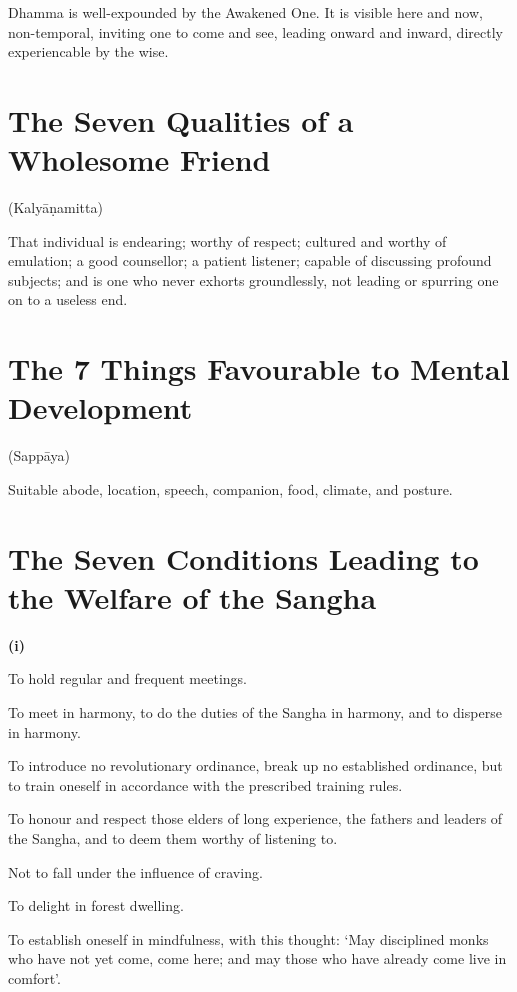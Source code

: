 Dhamma is well-expounded by the Awakened One. It is visible here and now,
non-temporal, inviting one to come and see, leading onward and inward, directly
experiencable by the wise.


\section{The Seven Qualities of a Wholesome Friend}

(Kalyāṇamitta)

That individual is endearing; worthy of respect; cultured and worthy of
emulation; a good counsellor; a patient listener; capable of discussing profound
subjects; and is one who never exhorts groundlessly, not leading or spurring one
on to a useless end.


\section{The 7 Things Favourable to Mental Development}

(Sappāya)

Suitable abode, location, speech, companion, food, climate, and posture.


\section{The Seven Conditions Leading to the Welfare of the Sangha}

\textbf{(i)}

To hold regular and frequent meetings.

To meet in harmony, to do the duties of the Sangha in harmony, and to disperse
in harmony.

To introduce no revolutionary ordinance, break up no established ordinance, but
to train oneself in accordance with the prescribed training rules.

To honour and respect those elders of long experience, the fathers and leaders
of the Sangha, and to deem them worthy of listening to.

Not to fall under the influence of craving.

To delight in forest dwelling.

To establish oneself in mindfulness, with this thought: ‘May disciplined monks
who have not yet come, come here; and may those who have already come live in
comfort’.

